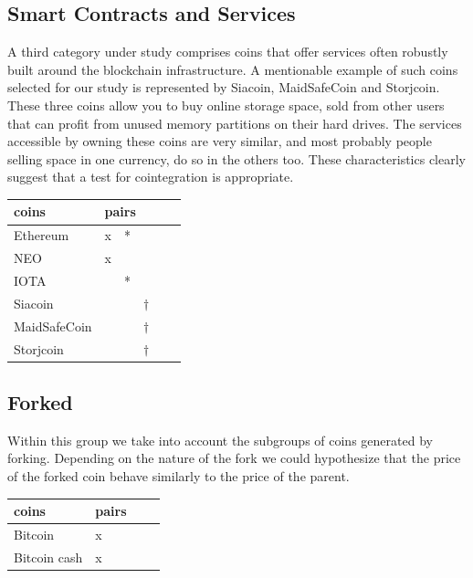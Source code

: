 \documentclass[a4paper,11pt]{article}
\theoremstyle{remark}
\theoremstyle{plain}
\begin{document}
\subsection{Smart Contracts and Services}
A third category under study comprises coins that offer services often robustly built around the blockchain infrastructure. A mentionable example of such coins selected for our study is represented by Siacoin, MaidSafeCoin and Storjcoin. These three coins allow you to buy online storage space, sold from other users that can profit from unused memory partitions on their hard drives. The services accessible by owning these coins are very similar, and most probably people selling space in one currency, do so in the others too. These characteristics clearly suggest that a test for cointegration is appropriate.

\begin{table}[h]
\centering
\begin{tabular}{l|lllll}
coins & \multicolumn{5}{l}{pairs} \\ \hline \hline
Ethereum     & x    &  *   &     &     &    \\ \hline
  NEO    &   x  &     &     &     &    \\ \hline
  IOTA    &     &  *   &     &     &    \\ \hline
  Siacoin    &     &     &  $\dagger$   &     &    \\ \hline
  MaidSafeCoin    &     &     &  $\dagger$   &     &    \\ \hline
   Storjcoin  &     &     &  $\dagger$   &     &   
\end{tabular}
\end{table}

\subsection{Forked}
Within this group we take into account the subgroups of coins generated by forking. Depending on the nature of the fork we could hypothesize that the price of the forked coin behave similarly to the price of the parent.

\begin{table}[h]
\centering
\begin{tabular}{l|lllll}
coins & \multicolumn{5}{l}{pairs} \\ \hline \hline
Bitcoin      &  x   &     &     &     &    \\ \hline
Bitcoin cash     & x    &     &     &     &    
\end{tabular}
\end{table}
\end{document}
